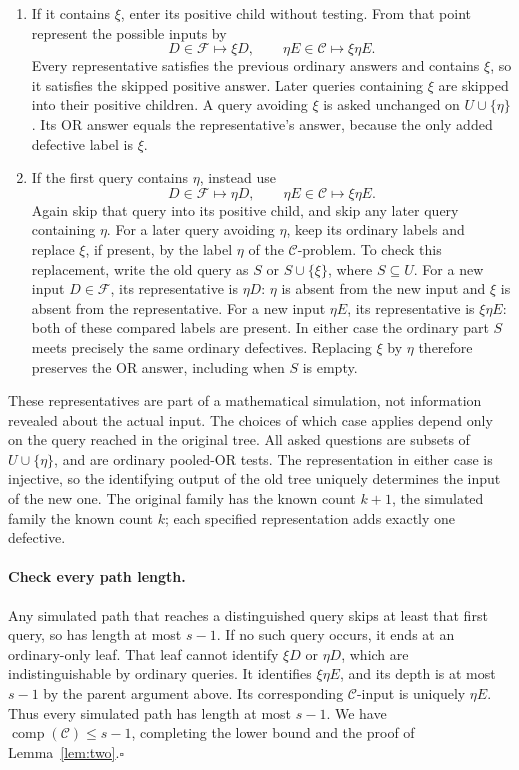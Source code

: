 \documentclass[11pt]{article}
\theoremstyle{definition}
\theoremstyle{remark}
\newcommand{\Comp}{\operatorname{comp}}
\numberwithin{equation}{section}
\begin{document}
\begin{enumerate}
\item If it contains \(\xi\), enter its positive child without testing.
From that point represent the possible inputs by
\[
 D\in\mathcal F\longmapsto \xi D,\qquad
 \eta E\in\mathcal C\longmapsto\xi\eta E.
\]
Every representative satisfies the previous ordinary answers and
contains \(\xi\), so it satisfies the skipped positive answer.
Later queries containing \(\xi\) are skipped into their positive
children. A query avoiding \(\xi\) is asked unchanged on
\(U\cup\{\eta\}\). Its OR answer equals the representative's answer,
because the only added defective label is \(\xi\).

\item If the first query contains \(\eta\), instead use
\[
 D\in\mathcal F\longmapsto\eta D,\qquad
 \eta E\in\mathcal C\longmapsto\xi\eta E.
\]
Again skip that query into its positive child, and skip any later
query containing \(\eta\). For a later query avoiding \(\eta\),
keep its ordinary labels and replace \(\xi\), if present, by the
label \(\eta\) of the \(\mathcal C\)-problem.
To check this replacement, write the old query as \(S\) or
\(S\cup\{\xi\}\), where \(S\subseteq U\). For a new input
\(D\in\mathcal F\), its representative is \(\eta D\):
\(\eta\) is absent from the new input and \(\xi\) is absent from
the representative. For a new input \(\eta E\), its representative
is \(\xi\eta E\): both of these compared labels are present.
In either case the ordinary part \(S\) meets precisely the same
ordinary defectives. Replacing \(\xi\) by \(\eta\) therefore preserves
the OR answer, including when \(S\) is empty.
\end{enumerate}

These representatives are part of a mathematical simulation, not
information revealed about the actual input. The choices of which
case applies depend only on the query reached in the original tree.
All asked questions are subsets of \(U\cup\{\eta\}\), and are
ordinary pooled-OR tests. The representation in either case is
injective, so the identifying output of the old tree uniquely
determines the input of the new one. The original family has the
known count \(k+1\), the simulated family the known count \(k\);
each specified representation adds exactly one defective.

\paragraph{Check every path length.}
Any simulated path that reaches a distinguished query skips at
least that first query, so has length at most \(s-1\).
If no such query occurs, it ends at an ordinary-only leaf.
That leaf cannot identify \(\xi D\) or \(\eta D\), which are
indistinguishable by ordinary queries. It identifies \(\xi\eta E\),
and its depth is at most \(s-1\) by the parent argument above.
Its corresponding \(\mathcal C\)-input is uniquely \(\eta E\).
Thus every simulated path has length at most \(s-1\).
We have \(\Comp(\mathcal C)\le s-1\), completing the lower bound
and the proof of Lemma~\ref{lem:two}.\quad\hfill\(\square\)
\end{document}
